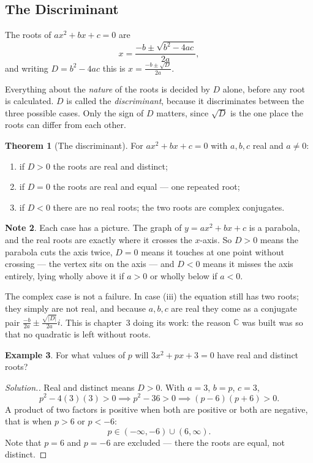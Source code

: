 \documentclass[11pt,a4paper]{article}
\theoremstyle{definition}
\newtheorem{thm}{Theorem}[section]
\newtheorem{example}[thm]{Example}
\newtheorem{note}[thm]{Note}
\newenvironment{solution}
  {\renewcommand{\qedsymbol}{}\begin{proof}[\textit{Solution}.]}
  {\end{proof}}
\begin{document}
\subsection{The Discriminant}
The roots of $ax^{2}+bx+c=0$ are
$$x=\frac{-b\pm\sqrt{b^{2}-4ac}}{2a},$$
and writing $D=b^{2}-4ac$ this is $x=\frac{-b\pm\sqrt{D}}{2a}$.

Everything about the \emph{nature} of the roots is decided by $D$ alone, before any
root is calculated. $D$ is called the \emph{discriminant}, because it discriminates
between the three possible cases. Only the sign of $D$ matters, since $\sqrt{D}$ is
the one place the roots can differ from each other.

\begin{thm}[The discriminant]
For $ax^{2}+bx+c=0$ with $a,b,c$ real and $a\neq 0$:
\begin{enumerate}
\item[(i).] if $D>0$ the roots are real and distinct;
\item[(ii).] if $D=0$ the roots are real and equal --- one repeated root;
\item[(iii).] if $D<0$ there are no real roots; the two roots are complex conjugates.
\end{enumerate}
\end{thm}

\begin{note}
Each case has a picture. The graph of $y=ax^{2}+bx+c$ is a parabola, and the real
roots are exactly where it crosses the $x$-axis. So $D>0$ means the parabola cuts
the axis twice, $D=0$ means it touches at one point without crossing --- the vertex
sits on the axis --- and $D<0$ means it misses the axis entirely, lying wholly above
it if $a>0$ or wholly below if $a<0$.

The complex case is not a failure. In case (iii) the equation still has two roots;
they simply are not real, and because $a,b,c$ are real they come as a conjugate
pair $\frac{-b}{2a}\pm\frac{\sqrt{\left|D\right|}}{2a}i$. This is chapter~3 doing its
work: the reason $\mathbb{C}$ was built was so that no quadratic is left without
roots.
\end{note}

\begin{example}
For what values of $p$ will $3x^{2}+px+3=0$ have real and distinct roots?
\end{example}

\begin{solution}
Real and distinct means $D>0$. With $a=3$, $b=p$, $c=3$,
$$p^{2}-4(3)(3)>0 \implies p^{2}-36>0 \implies (p-6)(p+6)>0 .$$
A product of two factors is positive when both are positive or both are negative,
that is when $p>6$ or $p<-6$:
$$p\in(-\infty,-6)\cup(6,\infty).$$
Note that $p=6$ and $p=-6$ are excluded --- there the roots are equal, not distinct.
\end{solution}
\end{document}
